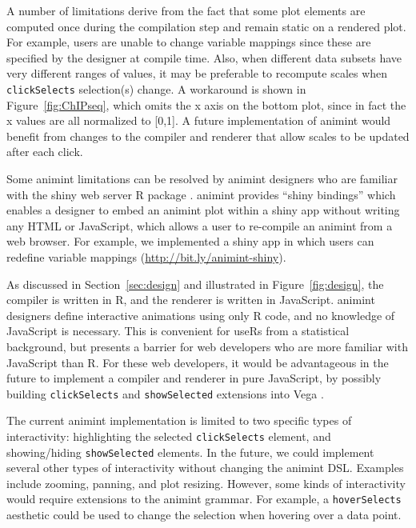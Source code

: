 \documentclass[journal]{vgtc}\usepackage[]{graphicx}\usepackage[]{color}
\begin{document}
A number of limitations derive from the fact that some plot elements
are computed once during the compilation step and remain static on a
rendered plot. For example, users are unable to change variable
mappings since these are specified by the designer at compile
time. Also, when different data subsets have very different ranges of
values, it may be preferable to recompute scales when
\texttt{clickSelects} selection(s) change. A workaround is shown in
Figure~\ref{fig:ChIPseq}, which omits the x axis on the bottom plot,
since in fact the x values are all normalized to [0,1]. A future
implementation of animint would benefit from changes to the compiler
and renderer that allow scales to be updated after each click.

Some animint limitations can be resolved by animint designers who are
familiar with the shiny web server R package \citep{shiny}.  animint
provides ``shiny bindings'' which enables a designer to embed an
animint plot within a shiny app without writing any HTML or
JavaScript, which allows a user to re-compile an animint from a web
browser. For example, we implemented a shiny app in which users can
redefine variable mappings (\url{http://bit.ly/animint-shiny}).

As discussed in Section~\ref{sec:design} and illustrated in
Figure~\ref{fig:design}, the compiler is written in R, and the
renderer is written in JavaScript.
animint designers define interactive animations using only R code, and
no knowledge of JavaScript is necessary. This is convenient for useRs
from a statistical background, but presents a barrier for web
developers who are more familiar with JavaScript than R. For these web
developers, it would be advantageous in the future to implement a
compiler and renderer in pure JavaScript, by possibly building
\texttt{clickSelects} and \texttt{showSelected} extensions into Vega
\citep{vega}.

The current animint implementation is limited to two specific types of
interactivity: highlighting the selected \texttt{clickSelects}
element, and showing/hiding \texttt{showSelected} elements. In the
future, we could implement several other types of interactivity
without changing the animint DSL. Examples include zooming,
panning, and plot resizing. However, some
kinds of interactivity would require extensions to the animint
grammar. For example, a \texttt{hoverSelects} aesthetic
could be used to change the selection when hovering over a data point.
\end{document}
